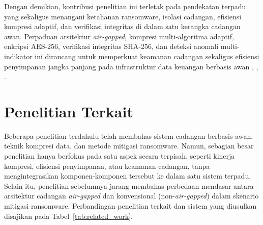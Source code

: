 \documentclass{iaesarticle}
\begin{document}
Dengan demikian, kontribusi penelitian ini terletak pada pendekatan terpadu yang sekaligus menangani ketahanan ransomware, isolasi cadangan, efisiensi kompresi adaptif, dan verifikasi integritas di dalam satu kerangka cadangan awan. Perpaduan arsitektur \textit{air-gapped}, kompresi multi-algoritma adaptif, enkripsi AES-256, verifikasi integritas SHA-256, dan deteksi anomali multi-indikator ini dirancang untuk memperkuat keamanan cadangan sekaligus efisiensi penyimpanan jangka panjang pada infrastruktur data keuangan berbasis awan \cite{18}, \cite{19}, \cite{20}.

\section{Penelitian Terkait}
\label{sec:terkait}
Beberapa penelitian terdahulu telah membahas sistem cadangan berbasis awan, teknik kompresi data, dan metode mitigasi ransomware. Namun, sebagian besar penelitian hanya berfokus pada satu aspek secara terpisah, seperti kinerja kompresi, efisiensi penyimpanan, atau keamanan cadangan, tanpa mengintegrasikan komponen-komponen tersebut ke dalam satu sistem terpadu. Selain itu, penelitian sebelumnya jarang membahas perbedaan mendasar antara arsitektur cadangan \textit{air-gapped} dan konvensional (non-\textit{air-gapped}) dalam skenario mitigasi ransomware. Perbandingan penelitian terkait dan sistem yang diusulkan disajikan pada Tabel~\ref{tab:related_work}.
\end{document}

